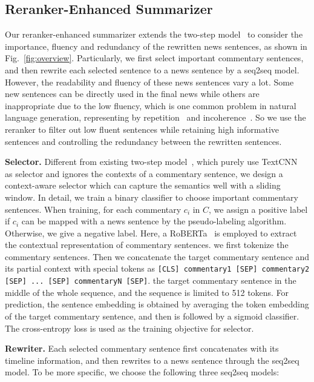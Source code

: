 \subsection{Reranker-Enhanced Summarizer}
Our reranker-enhanced summarizer extends the two-step model~\cite{Huang2020GeneratingSN} to consider the importance, fluency and redundancy of the rewritten news sentences, as shown in Fig.~\ref{fig:overview}.
Particularly, we first select important commentary sentences, and then rewrite each selected sentence to a news sentence by a seq2seq model. However, the readability and fluency of these news sentences vary a lot. Some new sentences can be directly used in the final news while others are inappropriate due to the low fluency, which is one common problem in natural language generation, representing by repetition~\cite{See2017GetTT} and incoherence~\cite{bellec2017deep}.
So we use the reranker to filter out low fluent sentences while retaining high informative sentences and controlling the redundancy between the rewritten sentences.

\vspace{1ex}
\noindent\textbf{Selector.} Different from existing two-step model~\cite{Huang2020GeneratingSN}, which purely use TextCNN~\cite{Kim2014ConvolutionalNN} as selector and ignores the contexts of a commentary sentence, we design a context-aware selector which can capture the semantics well with a sliding window.
In detail, we train a binary classifier to choose important commentary sentences. When training, for each commentary $c_{i}$ in $C$, we assign a positive label if $c_{i}$ can be mapped with a news sentence by the pseudo-labeling algorithm. Otherwise, we give a negative label.
Here, a RoBERTa~\cite{Liu2019RoBERTaAR} is employed to extract the contextual representation of commentary sentences.
we first tokenize the commentary sentences. Then we concatenate the target commentary sentence and its partial context with special tokens as \texttt{[CLS] commentary1 [SEP] commentary2 [SEP] ... [SEP] commentaryN [SEP]}. the target commentary sentence in the middle of the whole sequence, and the sequence is limited to 512 tokens.
For prediction, the sentence embedding is obtained by averaging the token embedding of the target commentary sentence, and then is followed by a sigmoid classifier.
The cross-entropy loss is used as the training objective for selector.

\vspace{1ex}
\noindent\textbf{Rewriter.} Each selected commentary sentence first concatenates with its timeline information, and then rewrites to a news sentence through the seq2seq model. To be more specific, we choose the following three seq2seq models:

